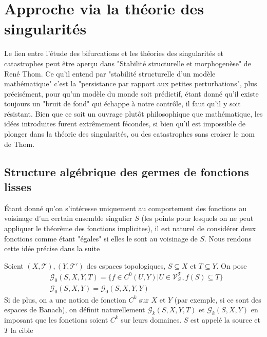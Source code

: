 \documentclass[memoire.tex]{subfiles}
\begin{document}
\section{Approche via la théorie des singularités}\label{SINGsection}

Le lien entre l'étude des bifurcations et les théories des 
singularités et catastrophes peut être aperçu 
dans "Stabilité structurelle et morphogenèse" de René Thom.
Ce qu'il entend par "stabilité structurelle d'un modèle 
mathématique" c'est la "persistance par rapport aux petites 
perturbations", plus précisément, pour qu'un modèle du 
monde soit prédictif, étant donné qu'il existe toujours un 
"bruit de fond" qui échappe à notre contrôle, il faut qu'il 
y soit résistant. Bien que ce soit un ouvrage plutôt 
philosophique que mathématique, les idées introduites 
furent extrêmement fécondes, si bien qu'il est impossible de 
plonger dans la théorie des singularités, ou des 
catastrophes sans croiser le nom de Thom.
\subsection{Structure algébrique des germes de fonctions lisses}
Étant donné qu'on s'intéresse uniquement au comportement des fonctions au voisinage d'un certain ensemble singulier $S$ (les points pour lesquels on ne peut appliquer le théorème des fonctions implicites), il est naturel de considérer deux fonctions comme étant "égales" si elles le sont au voisinage de $S$. Nous rendons cette idée précise dans la suite 
\begin{definition}
    Soient $(X,\mathcal{T}),(Y,\mathcal{T}')$ des espaces topologiques, $S\subseteq X$ et $T\subseteq Y$.       
    On pose 
    \begin{align*}
        &\mathcal{G}_{0}(S,X,Y,T)=\{ f\in C^0(U,Y) | U\in\mathcal{V}_{S}^{\mathcal{T}},f(S)\subseteq T\} \\
        & \mathcal{G}_{0}(S,X,Y)=\mathcal{G}_{0}(S,X,Y,Y)
    \end{align*}
    Si de plus, on a une notion de fonction $C^k$ sur $X$ et $Y$ (par exemple, si ce sont des espaces de Banach), on définit naturellement $\mathcal{G}_k(S,X,Y,T)$ et $\mathcal{G}_k(S,X,Y)$ en imposant que les fonctions soient $C^k$ sur leurs domaines. $S$ est appelé la source  et $T$ la cible
\end{definition}
\end{document}
